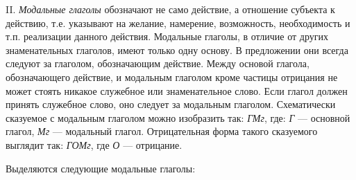 II. \emph{Модальные глаголы} обозначают не само действие, а отношение субъекта к действию, т.е. указывают на желание, намерение, возможность, необходимость и т.п. реализации данного действия. Модальные глаголы, в отличие от других знаменательных глаголов, имеют только одну основу. В предложении они всегда следуют за глаголом, обозначающим действие. Между основой глагола, обозначающего действие, и модальным глаголом кроме частицы отрицания не может стоять никакое служебное или знаменательное слово. Если глагол должен принять служебное слово, оно следует за модальным глаголом. Схематически сказуемое с модальным глаголом можно изобразить так: \emph{ГМг}, где: \emph{Г} --- основной глагол, \emph{Мг} --- модальный глагол. Отрицательная форма такого сказуемого выглядит так: \emph{ГОМг}, где \emph{О} --- отрицание.

Выделяются следующие модальные глаголы:
